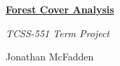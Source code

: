 \documentclass{article}[12pt]
\numberwithin{equation}{subsection}
\begin{document}
\begin{center}
\begin{Large} \textbf{\underline{Forest Cover Analysis}} \end{Large}
\end{center}

\begin{center}
\begin{large} \emph{TCSS-551 Term Project} \end{large}
\end{center}

\begin{center} Jonathan McFadden \end{center}


\vspace{2.75in}
\end{document}
